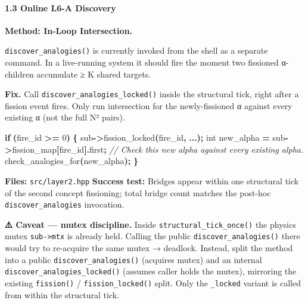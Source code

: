 \documentclass[
  11pt,
  a4paper,
]{article}
\newenvironment{Shaded}{\begin{snugshade}}{\end{snugshade}}
\newcommand{\CommentTok}[1]{\textcolor[rgb]{0.56,0.35,0.01}{\textit{#1}}}
\newcommand{\ControlFlowTok}[1]{\textcolor[rgb]{0.13,0.29,0.53}{\textbf{#1}}}
\newcommand{\DataTypeTok}[1]{\textcolor[rgb]{0.13,0.29,0.53}{#1}}
\newcommand{\DecValTok}[1]{\textcolor[rgb]{0.00,0.00,0.81}{#1}}
\newcommand{\NormalTok}[1]{#1}
\newcommand{\OperatorTok}[1]{\textcolor[rgb]{0.81,0.36,0.00}{\textbf{#1}}}
\begin{document}
\paragraph{1.3 Online L6-A Discovery}\label{online-l6-a-discovery}

\textbf{Method: In-Loop Intersection.}

\texttt{discover\_analogies()} is currently invoked from the shell as a
separate command. In a live-running system it should fire the moment two
fissioned α-children accumulate ≥ K shared targets.

\textbf{Fix.} Call \texttt{discover\_analogies\_locked()} inside the
structural tick, right after a fission event fires. Only run
intersection for the newly-fissioned α against every existing α (not the
full N² pairs).

\begin{Shaded}
\begin{Highlighting}[]
\ControlFlowTok{if} \OperatorTok{(}\NormalTok{fire\_id }\OperatorTok{\textgreater{}=} \DecValTok{0}\OperatorTok{)} \OperatorTok{\{}
\NormalTok{    sub}\OperatorTok{{-}\textgreater{}}\NormalTok{fission\_locked}\OperatorTok{(}\NormalTok{fire\_id}\OperatorTok{,} \OperatorTok{...);}
    \DataTypeTok{int}\NormalTok{ new\_alpha }\OperatorTok{=}\NormalTok{ sub}\OperatorTok{{-}\textgreater{}}\NormalTok{fission\_map}\OperatorTok{[}\NormalTok{fire\_id}\OperatorTok{].}\NormalTok{first}\OperatorTok{;}
    \CommentTok{// Check this new alpha against every existing alpha.}
\NormalTok{    check\_analogies\_for}\OperatorTok{(}\NormalTok{new\_alpha}\OperatorTok{);}
\OperatorTok{\}}
\end{Highlighting}
\end{Shaded}

\textbf{Files:} \texttt{src/layer2.hpp} \textbf{Success test:} Bridges
appear within one structural tick of the second concept fissioning;
total bridge count matches the post-hoc \texttt{discover\_analogies}
invocation.

\textbf{⚠️ Caveat --- mutex discipline.} Inside
\texttt{structural\_tick\_once()} the physics mutex
\texttt{sub-\textgreater{}mtx} is already held. Calling the public
\texttt{discover\_analogies()} there would try to re-acquire the same
mutex → deadlock. Instead, split the method into a public
\texttt{discover\_analogies()} (acquires mutex) and an internal
\texttt{discover\_analogies\_locked()} (assumes caller holds the mutex),
mirroring the existing \texttt{fission()} / \texttt{fission\_locked()}
split. Only the \texttt{\_locked} variant is called from within the
structural tick.
\end{document}
